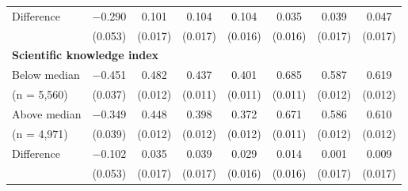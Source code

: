 \begin{tabular}[t]{lccccccc}
\hspace{1em}  Difference & \num{-0.290} & \num{0.101} & \num{0.104} & \num{0.104} & \num{0.035} & \num{0.039} & \num{0.047}\\
\hspace{2em} & (\num{0.053}) & (\num{0.017}) & (\num{0.017}) & (\num{0.016}) & (\num{0.016}) & (\num{0.017}) & (\num{0.017})\\\multicolumn{4}{l}{\textbf{Scientific knowledge index}} \rule{0pt}{1.2\normalbaselineskip}\\
\hspace{1em} Below median & \num{-0.451} & \num{0.482} & \num{0.437} & \num{0.401} & \num{0.685} & \num{0.587} & \num{0.619}\\
\hspace{2em}(n = 5,560) & (\num{0.037}) & (\num{0.012}) & (\num{0.011}) & (\num{0.011}) & (\num{0.011}) & (\num{0.012}) & (\num{0.012})\\
\hspace{1em} Above median & \num{-0.349} & \num{0.448} & \num{0.398} & \num{0.372} & \num{0.671} & \num{0.586} & \num{0.610}\\
\hspace{2em}(n = 4,971) & (\num{0.039}) & (\num{0.012}) & (\num{0.012}) & (\num{0.012}) & (\num{0.011}) & (\num{0.012}) & (\num{0.012})\\\cmidrule(lr){2-8}
\hspace{1em} Difference & \num{-0.102} & \num{0.035} & \num{0.039} & \num{0.029} & \num{0.014} & \num{0.001} & \num{0.009}\\
\hspace{2em} & (\num{0.053}) & (\num{0.017}) & (\num{0.017}) & (\num{0.016}) & (\num{0.016}) & (\num{0.017}) & (\num{0.017})\\
\end{tabular}
